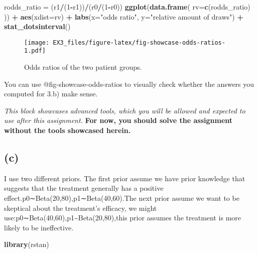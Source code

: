 \documentclass[
]{article}
\newenvironment{Shaded}{\begin{snugshade}}{\end{snugshade}}
\newcommand{\AttributeTok}[1]{\textcolor[rgb]{0.13,0.29,0.53}{#1}}
\newcommand{\DecValTok}[1]{\textcolor[rgb]{0.00,0.00,0.81}{#1}}
\newcommand{\FunctionTok}[1]{\textcolor[rgb]{0.13,0.29,0.53}{\textbf{#1}}}
\newcommand{\NormalTok}[1]{#1}
\newcommand{\OtherTok}[1]{\textcolor[rgb]{0.56,0.35,0.01}{#1}}
\newcommand{\SpecialCharTok}[1]{\textcolor[rgb]{0.81,0.36,0.00}{\textbf{#1}}}
\newcommand{\StringTok}[1]{\textcolor[rgb]{0.31,0.60,0.02}{#1}}
\begin{document}
\begin{Shaded}
\begin{Highlighting}[]
\NormalTok{rodds\_ratio }\OtherTok{=}\NormalTok{ (r1}\SpecialCharTok{/}\NormalTok{(}\DecValTok{1}\SpecialCharTok{{-}}\NormalTok{r1))}\SpecialCharTok{/}\NormalTok{(r0}\SpecialCharTok{/}\NormalTok{(}\DecValTok{1}\SpecialCharTok{{-}}\NormalTok{r0))}
\FunctionTok{ggplot}\NormalTok{(}\FunctionTok{data.frame}\NormalTok{(}
    \AttributeTok{rv=}\FunctionTok{c}\NormalTok{(rodds\_ratio)}
\NormalTok{)) }\SpecialCharTok{+}
    \FunctionTok{aes}\NormalTok{(}\AttributeTok{xdist=}\NormalTok{rv) }\SpecialCharTok{+} 
    \FunctionTok{labs}\NormalTok{(}\AttributeTok{x=}\StringTok{"odds ratio"}\NormalTok{, }\AttributeTok{y=}\StringTok{"relative amount of draws"}\NormalTok{) }\SpecialCharTok{+} 
    \FunctionTok{stat\_dotsinterval}\NormalTok{()}
\end{Highlighting}
\end{Shaded}

\begin{figure}
\centering
\texttt{[image: EX3\_files/figure-latex/fig-showcase-odds-ratios-1.pdf]}
\caption{Odds ratios of the two patient groups.}
\end{figure}

You can use @fig-showcase-odds-ratios to visually check whether the
answers you computed for 3.b) make sense.

\emph{This block showcases advanced tools, which you will be allowed and
expected to use after this assignment.} \textbf{For now, you should
solve the assignment without the tools showcased herein.}

\hypertarget{c-1}{%
\subsection{(c)}\label{c-1}}

I use two different priors. The first prior assume we have prior
knowledge that suggests that the treatment generally has a positive
effect.p0∼Beta(20,80),p1∼Beta(40,60).The next prior assume we want to be
skeptical about the treatment's efficacy, we might
use:p0∼Beta(40,60),p1\textasciitilde Beta(20,80),this prior assumes the
treatment is more likely to be ineffective.

\begin{Shaded}
\begin{Highlighting}[]
\FunctionTok{library}\NormalTok{(rstan)}
\end{Highlighting}
\end{Shaded}
\end{document}

